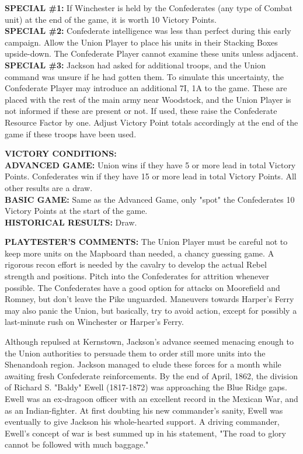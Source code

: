 \begin{scenariodata}
\textbf{SPECIAL \#1:} If Winchester is held by the Confederates (any type of
Combat unit) at the end of the game, it is worth 10 Victory Points.\\
\textbf{SPECIAL \#2:} Confederate intelligence was less than perfect during
this early campaign. Allow the Union Player to place his units in their
Stacking Boxes upside-down. The Confederate Player cannot examine these units
unless adjacent.\\
\textbf{SPECIAL \#3:} Jackson had asked for additional troops, and the Union
command was unsure if he had gotten them. To simulate this uncertainty, the
Confederate Player may introduce an additional 7I, 1A to the game. These are
placed with the rest of the main army near Woodstock, and the Union Player is
not informed if these are present or not. If used, these raise the Confederate
Resource Factor by one. Adjust Victory Point totals accordingly at the end of
the game if these troops have been used.
\end{scenariodata}

\begin{scenariodata}
\textbf{VICTORY CONDITIONS:}\\
\textbf{ADVANCED GAME:} Union wins if they have 5 or more lead in total
Victory Points. Confederates win if they have 15 or more lead in total Victory
Points. All other results are a draw.\\
\textbf{BASIC GAME:} Same as the Advanced Game, only "spot" the Confederates
10 Victory Points at the start of the game.\\
\textbf{HISTORICAL RESULTS:} Draw.
\end{scenariodata}

\begin{scenariodata}
\textbf{PLAYTESTER'S COMMENTS:} The Union Player must be careful not to keep
more units on the Mapboard than needed, a chancy guessing game. A rigorous
recon effort is needed by the cavalry to develop the actual Rebel strength and
positions. Pitch into the Confederates for attrition whenever possible. The
Confederates have a good option for attacks on Moorefield and Romney, but don't
leave the Pike unguarded. Maneuvers towards Harper's Ferry may also panic the
Union, but basically, try to avoid action, except for possibly a last-minute
rush on Winchester or Harper's Ferry.
\end{scenariodata}

Although repulsed at Kernstown, Jackson's advance seemed menacing enough to the
Union authorities to persuade them to order still more units into the
Shenandoah region. Jackson managed to elude these forces for a month while
awaiting fresh Confederate reinforcements. By the end of April, 1862, the
division of Richard S. "Baldy" Ewell (1817-1872) was approaching the Blue Ridge
gaps. Ewell was an ex-dragoon officer with an excellent record in the Mexican
War, and as an Indian-fighter. At first doubting his new commander's sanity,
Ewell was eventually to give Jackson his whole-hearted support. A driving
commander, Ewell's concept of war is best summed up in his statement, "The road
to glory cannot be followed with much baggage."

